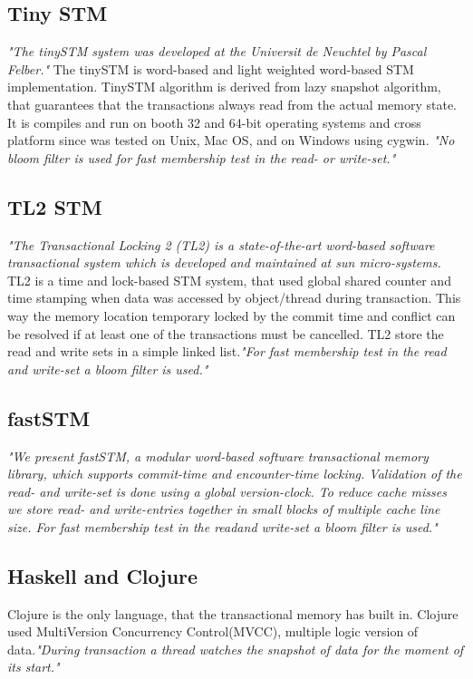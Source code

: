 \documentclass[12pt]{article}
\begin{document}
\subsection{Tiny STM}
\textit{"The tinySTM system was developed at the Universit de Neuchtel by Pascal Felber."}\cite{Olivier}  The tinySTM is word-based and light weighted word-based STM implementation. TinySTM algorithm is derived from lazy snapshot algorithm, that guarantees that the transactions always read from the actual memory state. It is compiles and run on booth 32 and 64-bit operating systems and cross platform since was tested on Unix, Mac OS, and on Windows using cygwin. \textit{"No bloom filter is used for fast membership test in the read- or write-set."}\cite{Olivier}

\subsection{TL2 STM}
\textit{"The Transactional Locking 2 (TL2) is a state-of-the-art word-based software transactional system which is developed and maintained at sun micro-systems.}\cite{Olivier} TL2 is a time and lock-based STM system, that used global shared counter and time stamping when data was accessed by object/thread during transaction. This way the memory location temporary locked by the commit time and conflict can be resolved if at least one of the transactions must be cancelled. TL2 store the read and write sets in a simple linked list.\textit{"For fast membership test in the read and
write-set a bloom filter is used."}\cite{Olivier}

\subsection{fastSTM}
\textit{"We present fastSTM, a modular word-based software transactional memory library, which supports commit-time and encounter-time locking. Validation of the read- and write-set is done using a global version-clock. To reduce cache misses we store read- and write-entries together in small blocks of multiple cache line size. For fast membership test in the readand write-set a bloom filter is used."}\cite{Olivier}

\subsection{Haskell and Clojure}
Clojure is the only language, that the transactional memory has built in. Clojure used MultiVersion Concurrency Control(MVCC), multiple logic version of data.\textit{"During transaction a thread watches the snapshot of data for the moment of its start."}\cite{JIghtuse}\\
\end{document}
